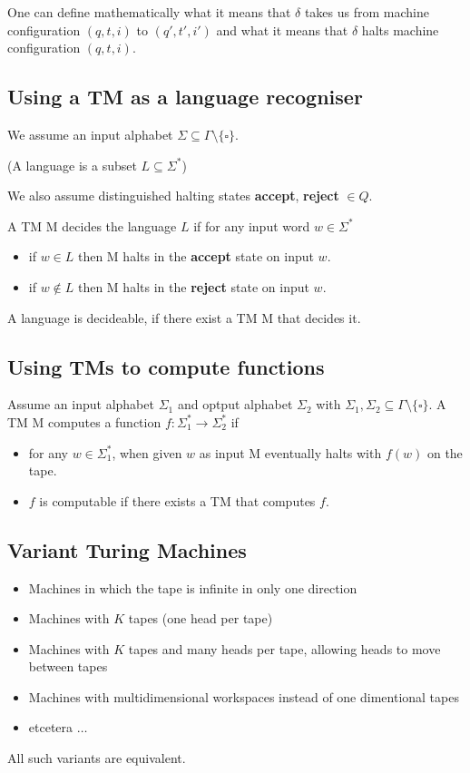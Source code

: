 \documentclass[a4paper,12pt]{article}
\theoremstyle{definition}
\theoremstyle{remark}
\begin{document}
One can define mathematically what it means that $\delta$ takes us from machine configuration $(q, t, i)$ to $(q', t', i')$ and
what it means that $\delta$ halts machine configuration $(q, t, i)$.

\subsection{Using a TM as a language recogniser}
We assume an input alphabet $\Sigma \subseteq \Gamma \setminus \{\square\}$.

(A language is a subset $L \subseteq \Sigma^*$)

We also assume distinguished halting states \textbf{accept}, \textbf{reject} $\in Q$.

A TM M decides the language $L$ if for any input word $w \in \Sigma^*$
\begin{itemize}
    \item if $w \in L$ then M halts in the \textbf{accept} state on input $w$.
    \item if $w \notin L$ then M halts in the \textbf{reject} state on input $w$.
\end{itemize}

A language is decideable, if there exist a TM M that decides it.

\subsection{Using TMs to compute functions}
Assume an input alphabet $\Sigma_1$ and optput alphabet $\Sigma_2$ with $\Sigma_1, \Sigma_2 \subseteq \Gamma \setminus \{\square\}$.
A TM M computes a function $f: \Sigma_1^* \to \Sigma_2^*$ if
\begin{itemize}
    \item for any $w \in \Sigma_1^*$, when given $w$ as input M eventually halts with $f(w)$ on the tape.
    \item $f$ is computable if there exists a TM that computes $f$.
\end{itemize}

\subsection{Variant Turing Machines}
\begin{itemize}
    \item Machines in which the tape is infinite in only one direction
    \item Machines with $K$ tapes (one head per tape)
    \item Machines with $K$ tapes and many heads per tape, allowing heads to move between tapes
    \item Machines with multidimensional workspaces instead of one dimentional tapes
    \item etcetera $\dots$
\end{itemize}
All such variants are equivalent.
\end{document}
